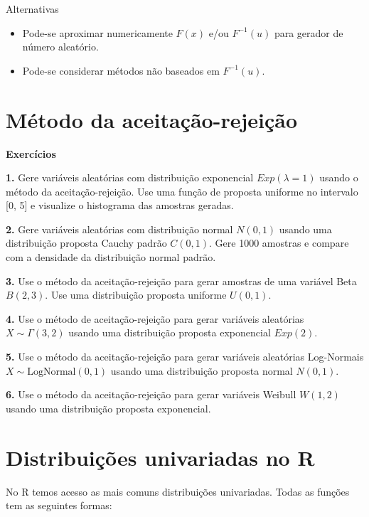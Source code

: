 \documentclass[
]{book}
\begin{document}
Alternativas

\begin{itemize}
\item
  Pode-se aproximar numericamente \(F(x)\) e/ou \(F^{-1}(u)\) para gerador
  de número aleatório.
\item
  Pode-se considerar métodos não baseados em \(F^{-1}(u)\).
\end{itemize}

\chapter{Método da aceitação-rejeição}\label{muxe9todo-da-aceitauxe7uxe3o-rejeiuxe7uxe3o}

\textbf{Exercícios}

\textbf{1.} Gere variáveis aleatórias com distribuição exponencial
\(Exp(\lambda = 1)\) usando o método da aceitação-rejeição. Use uma função
de proposta uniforme no intervalo {[}0, 5{]} e visualize o histograma das
amostras geradas.

\textbf{2.} Gere variáveis aleatórias com distribuição normal \(N(0,1)\) usando
uma distribuição proposta Cauchy padrão \(C(0,1)\). Gere 1000 amostras e
compare com a densidade da distribuição normal padrão.

\textbf{3.} Use o método da aceitação-rejeição para gerar amostras de uma
variável Beta \(B(2, 3)\). Use uma distribuição proposta uniforme
\(U(0, 1)\).

\textbf{4.} Use o método de aceitação-rejeição para gerar variáveis
aleatórias \(X \sim \Gamma(3, 2)\) usando uma distribuição proposta
exponencial \(Exp(2)\).

\textbf{5.} Use o método da aceitação-rejeição para gerar variáveis
aleatórias Log-Normais \(X \sim \text{LogNormal}(0, 1)\) usando uma
distribuição proposta normal \(N(0, 1)\).

\textbf{6.} Use o método da aceitação-rejeição para gerar variáveis Weibull
\(W(1, 2)\) usando uma distribuição proposta exponencial.

\chapter{Distribuições univariadas no R}\label{distribuiuxe7uxf5es-univariadas-no-r}

No R temos acesso as mais comuns distribuições univariadas. Todas as
funções tem as seguintes formas:
\end{document}
